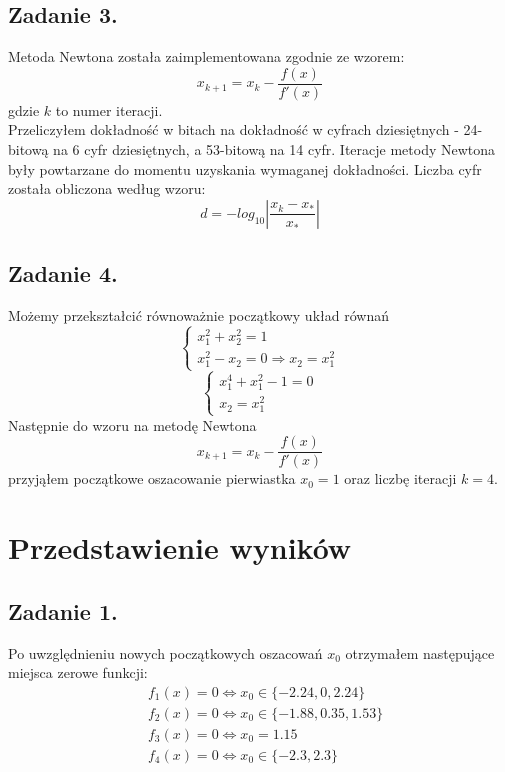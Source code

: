 \documentclass[11pt]{scrartcl}
\begin{document}
    \subsection{Zadanie 3.}
    Metoda Newtona została zaimplementowana zgodnie ze
    wzorem:
    \[
        x_{k+1}=x_k-\frac{f(x)}{f'(x)}
    \]
    gdzie $k$ to numer iteracji. \\
    Przeliczyłem dokładność w bitach na dokładność w cyfrach
    dziesiętnych - 24-bitową na 6 cyfr dziesiętnych,
    a 53-bitową na 14 cyfr. Iteracje metody Newtona były
    powtarzane do momentu uzyskania wymaganej dokładności.
    Liczba cyfr została obliczona według wzoru:
    \[
        d=-log_{10}\left| \frac{x_k-x_*}{x_*} \right|
    \]

    \subsection{Zadanie 4.}
    Możemy przekształcić równoważnie początkowy układ równań
    \[
        \begin{cases}
            x_1^2+x_2^2 = 1 \\
            x_1^2-x_2 = 0 \Rightarrow x_2=x_1^2
        \end{cases}
    \]
    \[
        \begin{cases}
            x_1^4+x_1^2-1=0 \\
            x_2=x_1^2
        \end{cases}
    \]
    Następnie do wzoru na metodę Newtona
    \[
        x_{k+1}=x_k-\frac{f(x)}{f'(x)}
    \]
    przyjąłem początkowe oszacowanie pierwiastka $x_0=1$
    oraz liczbę iteracji $k=4$.

    \section{Przedstawienie wyników}
    \subsection{Zadanie 1.}
    Po uwzględnieniu nowych początkowych oszacowań $x_0$
    otrzymałem następujące miejsca zerowe funkcji:
    \begin{align*}
        &f_1(x)=0 \Leftrightarrow x_0\in \{-2.24,0,2.24\} \\
        &f_2(x)=0 \Leftrightarrow x_0\in \{-1.88,0.35,1.53\} \\
        &f_3(x)=0 \Leftrightarrow x_0=1.15 \\
        &f_4(x)=0 \Leftrightarrow x_0\in \{-2.3,2.3\}
    \end{align*}
\end{document}
